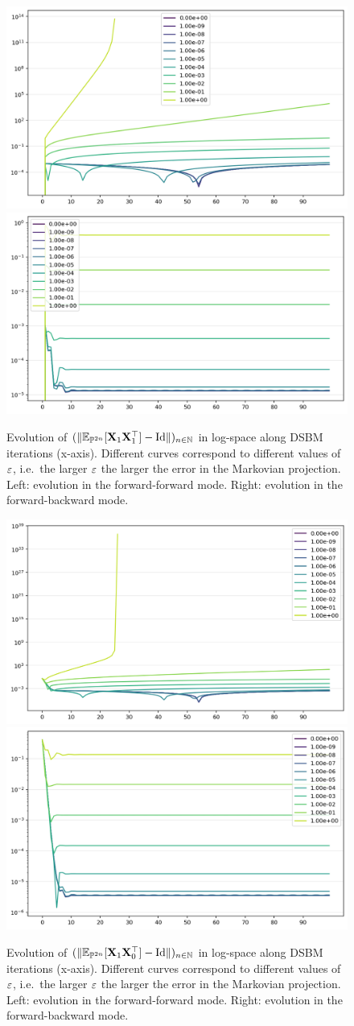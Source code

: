 \documentclass{article}
\begin{document}
\begin{figure}
    \centering
    \includegraphics[width=.45\linewidth]{img/error_accumulation_11_ff.png} \hfill
    \includegraphics[width=.45\linewidth]{img/error_accumulation_11_fb.png}
    \caption{Evolution of $(\|\mathbb{E}_{\mathbb{P}^{2n}}[\mathbf{X}_1 \mathbf{X}_1^\top] - \mathrm{Id}\|)_{n \in \mathbb{N}}$ in log-space along DSBM iterations (x-axis). Different curves correspond to different values of $\varepsilon$, i.e.~the larger $\varepsilon$ the larger the error in the Markovian projection. Left: evolution in the forward-forward mode. Right: evolution in the forward-backward mode.}
    \label{fig:error_accumulation_variance}
\end{figure}

\begin{figure}
    \centering
    \includegraphics[width=.45\linewidth]{img/error_accumulation_01_ff.png} \hfill
    \includegraphics[width=.45\linewidth]{img/error_accumulation_01_fb.png}
    \caption{Evolution of $(\|\mathbb{E}_{\mathbb{P}^{2n}}[\mathbf{X}_1 \mathbf{X}_0^\top] - \mathrm{Id}\|)_{n \in \mathbb{N}}$ in log-space along DSBM iterations (x-axis). Different curves correspond to different values of $\varepsilon$, i.e.~the larger $\varepsilon$ the larger the error in the Markovian projection. Left: evolution in the forward-forward mode. Right: evolution in the forward-backward mode.}
    \label{fig:error_accumulation_covariance}
\end{figure}
\end{document}
